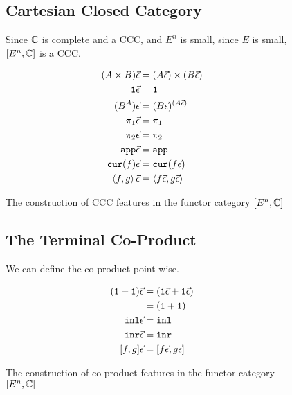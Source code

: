 \documentclass{Report}
\begin{document}
\begin{figure}
    
    \begin{framed}
        \subsection{Cartesian Closed Category}
Since $\mathbb{C}$ is complete  and a CCC, and $E^n$ is small, since $E$ is small, $[E^n, \mathbb{C}]$ is a CCC.

\begin{align}
    (A\times B)\vec{\epsilon} & = (A\vec{\epsilon})\times(B\vec{\epsilon})\\
    \texttt{1}\vec{\epsilon} & = \texttt{1}\\
    (B^A)\vec{\epsilon} &= (B\vec{\epsilon})^{(A\vec{\epsilon})}\\
    \pi_1\vec{\epsilon} & = \pi_1\\
    \pi_2\vec{\epsilon} & = \pi_2\\
    \texttt{app}\vec{\epsilon} & = \texttt{app}\\
    \texttt{cur}(f)\vec{\epsilon} & = \texttt{cur}(f\vec{\epsilon})\\
    \left\langle f, g\right\rangle\vec{\epsilon} & = \left\langle f\vec{\epsilon}, g\vec{\epsilon}\right\rangle\\
\end{align}

\end{framed}
\caption{The construction of CCC features in the functor category $[E^n, \mathbb{C}]$}
\label{HowToBuildCCC}
\end{figure}

\begin{figure}
    
\begin{framed}
    \subsection{The Terminal Co-Product}

We can define the co-product point-wise.

\begin{align}
    (\texttt{1} + \texttt{1})\vec{\epsilon} & = (\texttt{1}\vec{\epsilon} + \texttt{1}\vec{\epsilon})\\
    & = (\texttt{1} + \texttt{1})\\
    \texttt{inl}\vec{\epsilon} &= \texttt{inl}\\
    \texttt{inr}\vec{\epsilon} &= \texttt{inr}\\
    [f, g]\vec{\epsilon} &= [f\vec{\epsilon}, g\vec{\epsilon}]\\
\end{align}
\end{framed}
\caption{The construction of co-product features in the functor category $[E^n, \mathbb{C}]$}
\label{HowToBuildCoproduct}
\end{figure}
\end{document}
